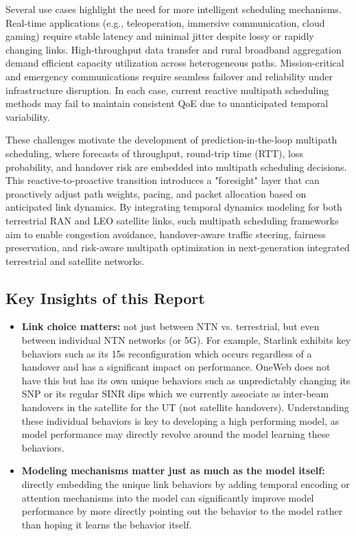 \documentclass[12pt]{article}
\begin{document}
Several use cases highlight the need for more intelligent scheduling mechanisms. Real-time applications (e.g., teleoperation, immersive communication, cloud gaming) require stable latency and minimal jitter despite lossy or rapidly changing links. High-throughput data transfer and rural broadband aggregation demand efficient capacity utilization across heterogeneous paths. Mission-critical and emergency communications require seamless failover and reliability under infrastructure disruption. In each case, current reactive multipath scheduling methods may fail to maintain consistent QoE due to unanticipated temporal variability.

These challenges motivate the development of prediction-in-the-loop multipath scheduling, where forecasts of throughput, round-trip time (RTT), loss probability, and handover risk are embedded into multipath scheduling decisions. This reactive-to-proactive transition introduces a "foresight" layer that can proactively adjust path weights, pacing, and packet allocation based on anticipated link dynamics. By integrating temporal dynamics modeling for both terrestrial RAN and LEO satellite links, such multipath scheduling frameworks aim to enable congestion avoidance, handover-aware traffic steering, fairness preservation, and risk-aware multipath optimization in next-generation integrated terrestrial and satellite networks. 

\subsection{Key Insights of this Report}

\begin{itemize}
    \item \textbf{Link choice matters: }not just between NTN vs. terrestrial, but even between individual NTN networks (or 5G). For example, Starlink exhibits key behaviors such as its 15s reconfiguration which occurs regardless of a handover and has a significant impact on performance. OneWeb does not have this but has its own unique behaviors such as unpredictably changing its SNP or its regular SINR dips which we currently associate as inter-beam handovers in the satellite for the UT (not satellite handovers). Understanding these individual behaviors is key to developing a high performing model, as model performance may directly revolve around the model learning these behaviors.
    \item \textbf{Modeling mechanisms matter just as much as the model itself: }directly embedding the unique link behaviors by adding temporal encoding or attention mechanisms into the model can significantly improve model performance by more directly pointing out the behavior to the model rather than hoping it learns the behavior itself.
\end{itemize}
\end{document}

